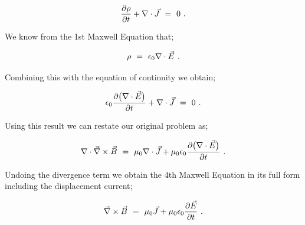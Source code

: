 \documentclass{article}
\begin{document}
\begin{equation} \label{eb-eq-51-31}
\frac{\partial{\rho}}{\partial{t}} + \nabla\cdot\vec{J} \hspace{0.125cm} = \hspace{0.125cm} 0 \hspace{0.125cm} .
\end{equation}

We know from the 1st Maxwell Equation that;

\begin{equation} \label{eb-eq-51-32}
\rho \hspace{0.125cm} = \hspace{0.125cm} \epsilon_{0} \nabla\cdot\vec{E} \hspace{0.125cm} .  
\end{equation}

Combining this with the equation of continuity we obtain;

\begin{equation} \label{eb-eq-51-33}
\epsilon_{0} \frac{\partial\big(\nabla\cdot{\vec{E}}\big)}{\partial{t}} + \nabla\cdot\vec{J} \hspace{0.125cm} = \hspace{0.125cm} 0 \hspace{0.125cm} .
\end{equation}

Using this result we can restate our original problem as;

\begin{equation} \label{eb-eq-51-34}
\nabla\cdot\vec{\nabla} \times \vec{B} \hspace{0.125cm} = \hspace{0.125cm} \mu_{0} \nabla\cdot\vec{J} + \mu_{0} \epsilon_{0} \frac{\partial\big(\nabla\cdot{\vec{E}}\big)}{\partial{t}} \hspace{0.125cm} .
\end{equation}

Undoing the divergence term we obtain the 4th Maxwell Equation in its full form including the displacement current;

\begin{equation} \label{eb-eq-51-35}
\vec{\nabla} \times \vec{B} \hspace{0.125cm} = \hspace{0.125cm} \mu_{0} \vec{J} + \mu_{0} \epsilon_{0} \frac{\partial{\vec{E}}}{\partial{t}} \hspace{0.125cm} .
\end{equation}
\end{document}

